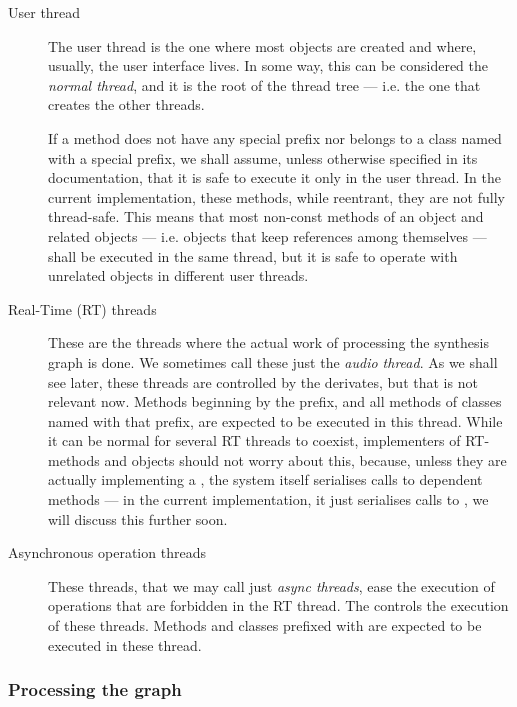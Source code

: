 \begin{description}
\item[User thread] The user thread is the one where
  most objects are created and where, usually, the user interface
  lives. In some way, this can be considered the \emph{normal thread},
  and it is the root of the thread tree --- i.e. the one that creates
  the other threads.

  If a method does not have any special prefix nor belongs to a class
  named with a special prefix, we shall assume, unless otherwise
  specified in its documentation, that it is safe to execute it only
  in the user thread. In the current implementation, these methods,
  while reentrant, they are not fully thread-safe. This means that
  most non-const methods of an object and related objects
  --- i.e. objects that keep references among themselves --- shall be
  executed in the same thread, but it is safe to operate with
  unrelated objects in different user threads.

\item[Real-Time (RT) threads]
  These are the threads where the actual work of processing the
  synthesis graph is done. We sometimes call these just the
  \emph{audio thread}. As we shall see later, these threads are
  controlled by the  derivates, but that is not
  relevant now. Methods beginning by the  prefix, and all
  methods of classes named with that prefix, are expected to be
  executed in this thread. While it can be normal for several RT
  threads to coexist, implementers of RT-methods and objects should
  not worry about this, because, unless they are actually implementing
  a , the system itself serialises calls to
  dependent methods --- in the current implementation, it just
  serialises calls to , we will discuss
  this further soon.

\item[Asynchronous operation threads] These
  threads, that we may call just \emph{async threads}, ease the
  execution of operations that are forbidden in the RT thread. The
   controls the execution of these threads. Methods
  and classes prefixed with  are expected to be executed
  in these thread.
\end{description}

\subsubsection{Processing the graph}

